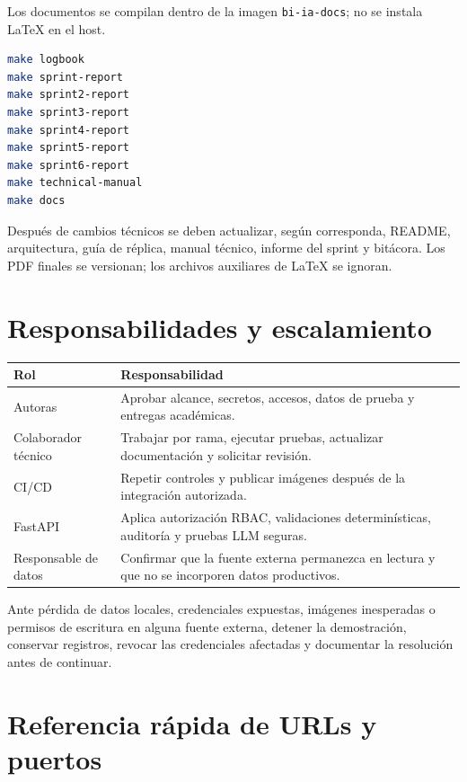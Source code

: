\documentclass[11pt,letterpaper]{article}
\newcommand{\file}[1]{\texttt{#1}}
\begin{document}
Los documentos se compilan dentro de la imagen \file{bi-ia-docs}; no se instala LaTeX en el host.

\begin{lstlisting}[style=terminal,language=bash]
make logbook
make sprint-report
make sprint2-report
make sprint3-report
make sprint4-report
make sprint5-report
make sprint6-report
make technical-manual
make docs
\end{lstlisting}

Después de cambios técnicos se deben actualizar, según corresponda, README, arquitectura, guía de réplica, manual técnico, informe del sprint y bitácora. Los PDF finales se versionan; los archivos auxiliares de LaTeX se ignoran.

\section{Responsabilidades y escalamiento}

\begin{tabularx}{\textwidth}{@{}p{}X@{}}
  \toprule
  Rol & Responsabilidad \\
  \midrule
  Autoras & Aprobar alcance, secretos, accesos, datos de prueba y entregas académicas. \\
  Colaborador técnico & Trabajar por rama, ejecutar pruebas, actualizar documentación y solicitar revisión. \\
  CI/CD & Repetir controles y publicar imágenes después de la integración autorizada. \\
  FastAPI & Aplica autorización RBAC, validaciones determinísticas, auditoría y pruebas LLM seguras. \\
  Responsable de datos & Confirmar que la fuente externa permanezca en lectura y que no se incorporen datos productivos. \\
  \bottomrule
\end{tabularx}

Ante pérdida de datos locales, credenciales expuestas, imágenes inesperadas o permisos de escritura en alguna fuente externa, detener la demostración, conservar registros, revocar las credenciales afectadas y documentar la resolución antes de continuar.

\appendix
\section{Referencia rápida de URLs y puertos}
\end{document}
